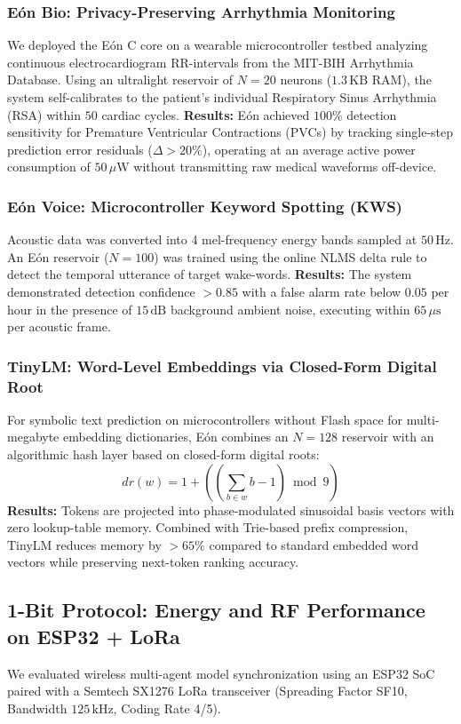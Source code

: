 \subsubsection{Eón Bio: Privacy-Preserving Arrhythmia Monitoring}
We deployed the Eón C core on a wearable microcontroller testbed analyzing continuous electrocardiogram RR-intervals from the MIT-BIH Arrhythmia Database. Using an ultralight reservoir of $N=20$ neurons ($1.3\,\text{KB}$ RAM), the system self-calibrates to the patient's individual Respiratory Sinus Arrhythmia (RSA) within $50$ cardiac cycles. 
\textbf{Results:} Eón achieved $100\%$ detection sensitivity for Premature Ventricular Contractions (PVCs) by tracking single-step prediction error residuals ($\Delta > 20\%$), operating at an average active power consumption of $50\,\mu\text{W}$ without transmitting raw medical waveforms off-device.

\subsubsection{Eón Voice: Microcontroller Keyword Spotting (KWS)}
Acoustic data was converted into 4 mel-frequency energy bands sampled at $50\,\text{Hz}$. An Eón reservoir ($N=100$) was trained using the online NLMS delta rule to detect the temporal utterance of target wake-words.
\textbf{Results:} The system demonstrated detection confidence $>0.85$ with a false alarm rate below $0.05$ per hour in the presence of $15\,\text{dB}$ background ambient noise, executing within $65\,\mu\text{s}$ per acoustic frame.

\subsubsection{TinyLM: Word-Level Embeddings via Closed-Form Digital Root}
For symbolic text prediction on microcontrollers without Flash space for multi-megabyte embedding dictionaries, Eón combines an $N=128$ reservoir with an algorithmic hash layer based on closed-form digital roots:
\begin{equation}
    dr(w) = 1 + \left( \left( \sum_{b \in w} b - 1 \right) \bmod 9 \right)
\end{equation}
\textbf{Results:} Tokens are projected into phase-modulated sinusoidal basis vectors with zero lookup-table memory. Combined with Trie-based prefix compression, TinyLM reduces memory by $>65\%$ compared to standard embedded word vectors while preserving next-token ranking accuracy.

\subsection{1-Bit Protocol: Energy and RF Performance on ESP32 + LoRa}
We evaluated wireless multi-agent model synchronization using an ESP32 SoC paired with a Semtech SX1276 LoRa transceiver (Spreading Factor SF10, Bandwidth $125\,\text{kHz}$, Coding Rate 4/5).

